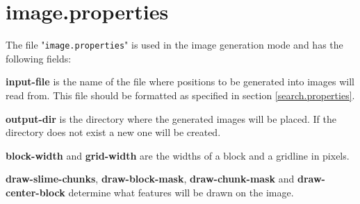 \documentclass[12pt]{article}
\begin{document}
\pagebreak
\section{\bfseries image.properties}
The file "\texttt{image.properties}" is used in the image generation mode and has the following fields:

\hspace{1.0cm}

\textbf{input-file} is the name of the file where positions to be generated into images will read from. This file should be formatted as specified in section \ref{search.properties}.

\textbf{output-dir} is the directory where the generated images will be placed. If the directory does not exist a new one will be created.

\textbf{block-width} and \textbf{grid-width} are the widths of a block and a gridline in pixels.

\textbf{draw-slime-chunks}, \textbf{draw-block-mask}, \textbf{draw-chunk-mask} and \textbf{draw-center-block} determine what features will be drawn on the image.
\end{document}
